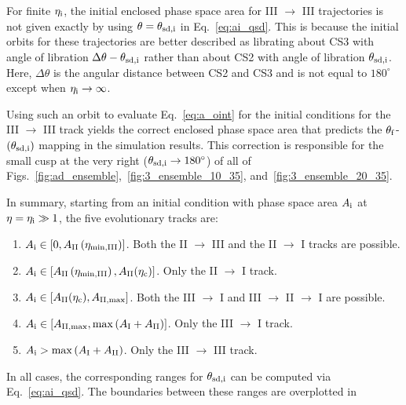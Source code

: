 \documentclass[
        fleqn,
        usenatbib,
    ]{mnras}
\newcommand*{\p}[1]{\left(#1\right)}
\newcommand*{\s}[1]{\left[#1\right]}
\begin{document}
\begin{enumerate}
        For finite $\eta_{\rm i}$, the initial enclosed phase space area for III
        $\to$ III trajectories is not given exactly by using $\theta =
        \theta_{\rm sd, i}$ in Eq.~\eqref{eq:ai_qsd}. This is because the
        initial orbits for these trajectories are better described as librating
        about CS3 with angle of libration $\Delta \theta - \theta_{\rm sd, i}$
        rather than about CS2 with angle of libration $\theta_{\rm sd, i}$.
        Here, $\Delta \theta$ is the angular distance between CS2 and CS3 and is
        not equal to $180^\circ$ except when $\eta_{\rm i} \to \infty$.

        Using such an orbit to evaluate Eq.~\eqref{eq:a_oint} for the initial
        conditions for the III $\to$ III track yields the correct enclosed phase
        space area that predicts the $\theta_{\rm f}$-$\p{\theta_{\rm sd, i}}$
        mapping in the simulation results. This correction is responsible for
        the small cusp at the very right ($\theta_{\rm sd, i} \to 180^\circ$) of
        all of Figs.~\ref{fig:ad_ensemble},~\ref{fig:3_ensemble_10_35},
        and~\ref{fig:3_ensemble_20_35}.
\end{enumerate}
In summary, starting from an initial condition with phase space area $A_{\rm i}$
at $\eta = \eta_{\rm i} \gg 1$, the five evolutionary tracks are:
\begin{enumerate}
    \item $A_{\rm i} \in \s{0, A_{\rm II}\p{\eta_{\rm \min, III}}}$. Both the II
        $\to$ III and the II $\to$ I tracks are possible.

    \item $A_{\rm i} \in \s{A_{\rm II}\p{\eta_{\rm \min, III}}, A_{\rm
        II}(\eta_{\rm c})}$. Only the II $\to$ I track.

    \item $A_{\rm i} \in \s{A_{\rm II}(\eta_{\rm c}), A_{\rm II, \max}}$.
        Both the III $\to$ I and III $\to$ II $\to$ I are possible.

    \item $A_{\rm i} \in \s{A_{\rm II, \max}, \max \p{A_{\rm I} + A_{\rm II}}}$.
        Only the III $\to$ I track.

    \item $A_{\rm i} > \max \p{A_{\rm I} + A_{\rm II}}$. Only the III $\to$ III
        track.
\end{enumerate}
In all cases, the corresponding ranges for $\theta_{\rm sd,i}$ can be computed via
Eq.~\eqref{eq:ai_qsd}. The boundaries between these ranges are overplotted in
\end{document}
